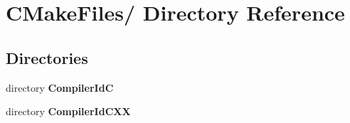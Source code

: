\section{CMakeFiles/ Directory Reference}
\label{dir_e7968aaf1150c5d82c2919845bd86c7e}
\subsection*{Directories}
\begin{DoxyCompactItemize}
\item 
directory {\bf CompilerIdC}
\item 
directory {\bf CompilerIdCXX}
\end{DoxyCompactItemize}
